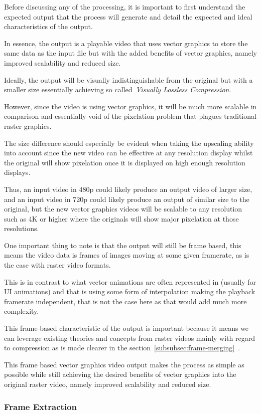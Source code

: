 \documentclass[12pt]{article}
\newcommand{\sentence}{} %
\newcommand{\italic}[1]{\textit{#1}}
\newcommand{\fullref}[1]{\ref{#1}~\nameref{#1}}
\begin{document}
    \tab
    Before discussing any of the processing, it is important to first understand the expected output that the process
    will generate and detail the expected and ideal characteristics of the output.
    \sentence
    In essence, the output is a playable video that uses vector graphics to store the same data as the input file but
    with the added benefits of vector graphics, namely improved scalability and reduced size.
    \sentence
    Ideally, the output will be visually indistinguishable from the original but with a smaller size essentially
    achieving so called~\italic{Visually Lossless Compression}.
    \sentence
    However, since the video is using vector graphics, it will be much more scalable in comparison and essentially
    void of the pixelation problem that plagues traditional raster graphics.
    \sentence
    The size difference should especially be evident when taking the upscaling ability into account since the new
    video can be effective at any resolution display whilst the original will show pixelation once it is displayed on
    high enough resolution displays.
    \sentence
    Thus, an input video in 480p could likely produce an output video of larger size, and an input video in 720p
    could likely produce an output of similar size to the original, but the new vector graphics videos will be
    scalable to any resolution such as 4K or higher where the originals will show major pixelation at those resolutions.
    \sentence
    One important thing to note is that the output will still be frame based, this means the video data is frames of
    images moving at some given framerate, as is the case with raster video formats.
    \sentence
    This is in contrast to what vector animations are often represented in (usually for UI animations) and that is
    using some form of interpolation making the playback framerate independent, that is not the case here as that
    would add much more complexity.
    \sentence
    This frame-based characteristic of the output is important because it means we can leverage existing theories and
    concepts from raster videos mainly with regard to compression as is made clearer in
    the section~\fullref{subsubsec:frame-merging}.
    \sentence
    This frame based vector graphics video output makes the process as simple as possible while still achieving the
    desired benefits of vector graphics into the original raster video, namely improved scalability and reduced size.

    \subsubsection{Frame Extraction}\label{subsubsec:frame-extraction}
\end{document}
